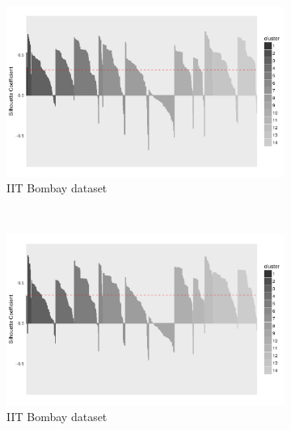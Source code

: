 \begin{figure}[h!]
	\captionsetup[subfigure]{justification=centering}
    \centering
    \begin{subfigure}[b]{0.45\textwidth}%
        \centering
        \includegraphics[width=\textwidth]{TKDE-QuerySimilarity/graphics/sil_bombay_Aligon}
		\caption{IIT Bombay dataset}
        \label{fig:sil_aligon:bombay}
    \end{subfigure}
    ~
    \begin{subfigure}[b]{0.45\textwidth}%
        \centering
        \includegraphics[width=\textwidth]{TKDE-QuerySimilarity/graphics/sil_bombay_Aligon_regularization}
		\caption{IIT Bombay dataset}
		\label{fig:sil_aligon:bombay_preprocess}
    \end{subfigure}
    \\
    \begin{subfigure}[b]{0.45\textwidth}%
        \centering

\end{subfigure}
\end{figure}
